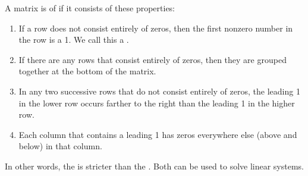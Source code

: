     \par A matrix is of  if it consists
    of these properties:

    \begin{enumerate}
      \item If a row does not consist entirely of zeros, then the first
        nonzero number in the row is a 1. We call this a .
      \item If there are any rows that consist entirely of zeros, then
        they are grouped together at the bottom of the matrix.
      \item In any two successive rows that do not consist entirely of
        zeros, the leading 1 in the lower row occurs farther to the right
        than the leading 1 in the higher row.
      \item Each column that contains a leading 1 has zeros everywhere
        else (above and below) in that column.
    \end{enumerate}
    \par In other words, the  is stricter than
      the . Both can be used to solve linear systems.
      
